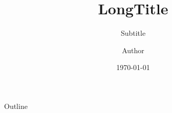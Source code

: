 \documentclass{beamer}
\title[ShortTitle]{LongTitle}
\subtitle{Subtitle}
\author{Author}
\institute{Institute}
\date{\today}
\begin{document}
\begin{frame}
  \titlepage
\end{frame}

\begin{frame}{Outline}
  \tableofcontents
\end{frame}
\end{document}
